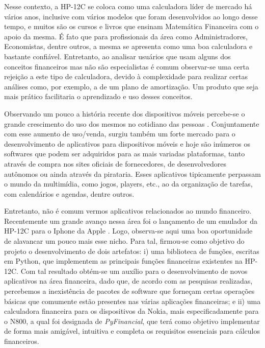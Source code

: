 Nesse contexto, a HP-12C \cite{hp12c} se coloca como uma calculadora líder de mercado há vários anos, inclusive com vários modelos que foram desenvolvidos ao longo desse tempo, e muitos são os cursos e livros que ensinam Matemática Financeira com o apoio da mesma. É fato que para profissionais da área como Administradores, Economistas, dentre outros, a mesma se apresenta como uma boa calculadora e bastante confiável. Entretanto, ao ana\-lisar usuários que usam alguns dos conceitos financeiros mas não são especialistas é comum observar-se uma certa rejeição a este tipo de calculadora, devido à complexidade para realizar certas análises como, por exemplo, a de um plano de amortização. Um produto que seja mais prático facilitaria o aprendizado e uso desses conceitos.

Observando um pouco a história recente dos dispositivos móveis percebe-se o grande crescimento do uso dos mesmos no cotidiano das pessoas \cite{celular}. Conjuntamente com esse aumento de uso/venda, surgiu também um forte mercado para o desenvolvimento de aplicativos para dispositivos móveis e hoje são inúmeros os softwares que podem ser adquiridos para as mais variadas plataformas, tanto através de compra nos sites oficiais de fornecedores, de desenvolvedores autônomos ou ainda através da pirataria. Esses aplicativos tipicamente perpassam o mundo da multimídia, como jogos, players, etc., ao da organização de tarefas, com calendários e agendas, dentre outros.

Entretanto, não é comum vermos aplicativos relacionados ao mundo financeiro. Recentemente um grande avanço nessa área foi o lançamento de um emulador da HP-12C para o Iphone da Apple \cite{iphone}. Logo, observa-se aqui uma boa oportunidade de alavancar um pouco mais esse nicho. Para tal, firmou-se como objetivo do projeto o desenvolvimento de dois artefatos: i) uma biblioteca de funções, escritas em Python, que implementem as principais funções financeiras existentes na HP-12C. Com tal resultado obtém-se um auxílio para o desenvolvimento de novos aplicativos na área financeira, dado que, de acordo com as pesquisas realizadas, percebemos a inexistência de pacotes de software que forneçam certas operações básicas que comumente estão presentes nas várias aplicações financeiras; e ii) uma calculadora financeira para os dispositivos da Nokia, mais especificadamente para o N800, a qual foi designada de \textit{PyFinancial}, que terá como objetivo implementar de forma mais amigável, intuitiva e completa os requisitos essenciais para cálculos financeiros. 

